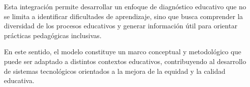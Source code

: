 \begin{refsection}
Esta integración permite desarrollar un enfoque de diagnóstico educativo que no se limita a identificar dificultades de aprendizaje, sino que busca comprender la diversidad de los procesos educativos y generar información útil para orientar prácticas pedagógicas inclusivas.

En este sentido, el modelo constituye un marco conceptual y metodológico que puede ser adaptado a distintos contextos educativos, contribuyendo al desarrollo de sistemas tecnológicos orientados a la mejora de la equidad y la calidad educativa.

\printbibliography[heading=subbibliography,title={Referencias (Capítulo V)}]

\end{refsection}